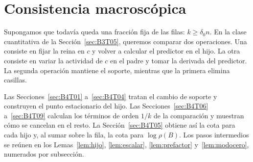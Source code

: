 \section{Consistencia macroscópica}\label{sec:macro}

Supongamos que todavía queda una fracción fija de las filas: $k\ge\delta_0 n$.
En la clase cuantitativa de la Sección~\ref{sec:B3T05}, queremos comparar dos operaciones.
Una consiste en fijar la reina en $c$ y volver a calcular el predictor en el hijo.
La otra consiste en variar la actividad de $c$ en el padre y tomar la derivada del predictor.
La segunda operación mantiene el soporte, mientras que la primera elimina casillas.

Las Secciones~\ref{sec:B4T01} a~\ref{sec:B4T04} tratan el cambio de soporte y construyen
el punto estacionario del hijo. Las Secciones~\ref{sec:B4T06} a~\ref{sec:B4T09} calculan los
términos de orden $1/k$ de la comparación y muestran cómo se cancelan en el resto.
La Sección~\ref{sec:B4T05} obtiene así la cota para cada hijo y, al sumar sobre la fila,
la cota para $\log\rho(B)$. Los pasos intermedios se reúnen en los Lemas~\ref{lem:hijo},
\ref{lem:escalar}, \ref{lem:prefactor} y~\ref{lem:modocero}, numerados por subsección.
